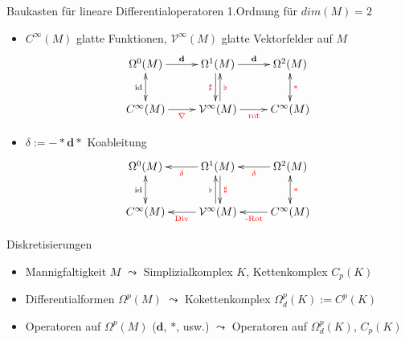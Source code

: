 \documentclass{beamer}
\newcommand{\exd}{\mathbf{d}}
\newcommand{\tred}[1]{\textcolor{red}{#1}}
\begin{document}
  \begin{frame}
    \begin{block}{Baukasten für lineare Differentialoperatoren 1.Ordnung für \( dim(M)=2 \)}
      \begin{itemize}
        \item<1-> \( C^{\infty}(M) \) glatte Funktionen, \( \mathcal{V}^{\infty}(M) \) glatte Vektorfelder auf \( M \)
          \begin{align*}
            \begin{xy} \xymatrix{
                \Omega^{0}(M) \ar[r]^{\exd} & \Omega^{1}(M) \ar[r]^{\exd} \ar@<-2pt>[d]_{\tred{\sharp}} & \Omega^{2}(M) \ar@{<->}[d]^{\tred{*}}\\
                C^{\infty}(M) \ar[r]_{\tred{\nabla}} \ar@{<->}[u]^{\text{id}} & \mathcal{V}^{\infty}(M) \ar[r]_{\tred{\text{rot}}} \ar@<-2pt>[u]_{\tred{\flat}} & C^{\infty}(M) }
            \end{xy}
          \end{align*}

        \item<2-> \( \delta := -*\exd * \) Koableitung
          \begin{align*}
            \begin{xy} \xymatrix{
              \Omega^{0}(M) \ar@{<->}[d]_{\text{id}} & \Omega^{1}(M) \ar[l]^{\tred{\delta}} \ar@<2pt>[d]^{\tred{\sharp}} & \Omega^{2}(M) \ar[l]^{\tred{\delta}}\\
              C^{\infty}(M) & \mathcal{V}^{\infty}(M) \ar[l]^{\tred{\text{Div}}} \ar@<2pt>[u]^{\tred{\flat}} & C^{\infty}(M) \ar[l]^{\tred{\text{-Rot}}} \ar@{<->}[u]_{\tred{*}} }
            \end{xy}
          \end{align*}
      \end{itemize}
    \end{block}
  \end{frame}

  \begin{frame}
    \begin{block}{Diskretisierungen}
      \begin{itemize}
        \item<1-> Mannigfaltigkeit \(M\) \( \leadsto \) Simplizialkomplex \( K \), Kettenkomplex \( C_{p}(K) \)
        \item<2-> Differentialformen \( \Omega^{p}(M) \) \( \leadsto \) Kokettenkomplex \( \Omega^{p}_{d}(K) :=   C^{p}(K)\)
        \item<3-> Operatoren auf \( \Omega^{p}(M) \) (\( \exd \), \( * \), usw.) \( \leadsto \) Operatoren auf \( \Omega^{p}_{d}(K) \), \( C_{p}(K) \)
      \end{itemize}
    \end{block}
  \end{frame}
\end{document}
